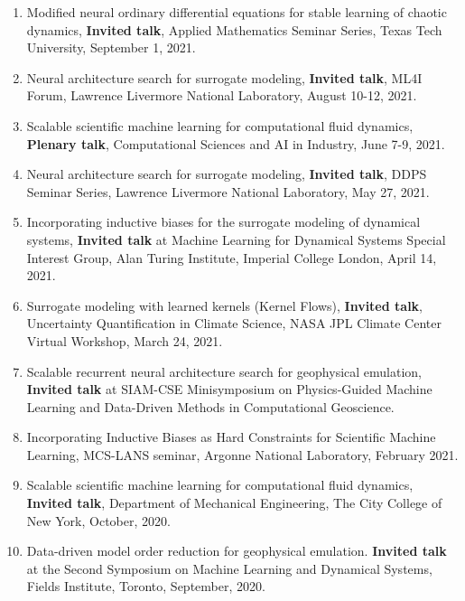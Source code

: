 \documentclass[letterpaper]{article}
\begin{document}
\begin{enumerate}
\item Modified neural ordinary differential equations for stable learning of chaotic dynamics, \textbf{Invited talk}, Applied Mathematics Seminar Series, Texas Tech University, September 1, 2021.

\item Neural architecture search for surrogate modeling, \textbf{Invited talk}, ML4I Forum, Lawrence Livermore National Laboratory, August 10-12, 2021.

\item Scalable scientific machine learning for computational fluid dynamics, \textbf{Plenary talk}, Computational Sciences and AI in Industry, June 7-9, 2021.

\item Neural architecture search for surrogate modeling, \textbf{Invited talk}, DDPS Seminar Series, Lawrence Livermore National Laboratory, May 27, 2021.

\item Incorporating inductive biases for the surrogate modeling of dynamical systems, \textbf{Invited talk} at Machine Learning for Dynamical Systems Special Interest Group, Alan Turing Institute, Imperial College London, April 14, 2021.

\item Surrogate modeling with learned kernels (Kernel Flows), \textbf{Invited talk}, Uncertainty Quantification in Climate Science, NASA JPL Climate Center Virtual Workshop, March 24, 2021.

\item Scalable recurrent neural architecture search for geophysical emulation, \textbf{Invited talk} at SIAM-CSE Minisymposium on Physics-Guided Machine Learning and Data-Driven Methods in Computational Geoscience.

\item Incorporating Inductive Biases as Hard Constraints for Scientific Machine Learning, MCS-LANS seminar, Argonne National Laboratory, February 2021.

\item Scalable scientific machine learning for computational fluid dynamics, \textbf{Invited talk}, Department of Mechanical Engineering, The City College of New York, October, 2020.

\item Data-driven model order reduction for geophysical emulation. \textbf{Invited talk} at the Second Symposium on Machine Learning and Dynamical Systems, Fields Institute, Toronto, September, 2020.


\end{enumerate}
\end{document}
